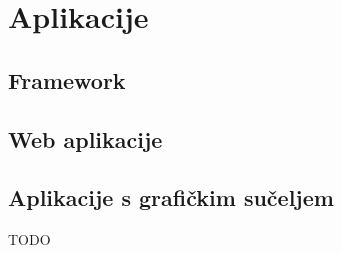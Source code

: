 \chapter{Aplikacije}

\section{Framework}

\section{Web aplikacije}

\section{Aplikacije s grafičkim sučeljem}

TODO

